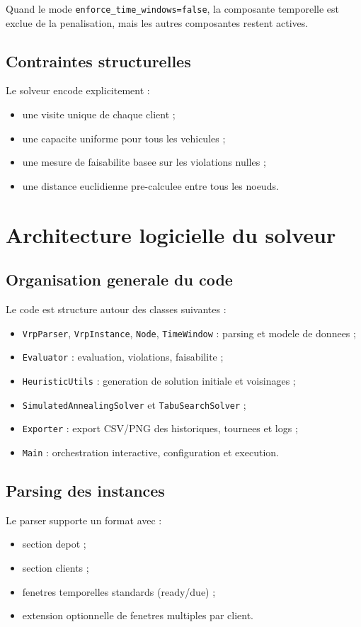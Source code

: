 \documentclass[12pt,a4paper]{report}
\begin{document}
Quand le mode \texttt{enforce\_time\_windows=false}, la composante temporelle est exclue de la penalisation,
mais les autres composantes restent actives.

\section{Contraintes structurelles}
Le solveur encode explicitement :
\begin{itemize}[leftmargin=1.2cm]
  \item une visite unique de chaque client ;
  \item une capacite uniforme pour tous les vehicules ;
  \item une mesure de faisabilite basee sur les violations nulles ;
  \item une distance euclidienne pre-calculee entre tous les noeuds.
\end{itemize}

\chapter{Architecture logicielle du solveur}

\section{Organisation generale du code}
Le code est structure autour des classes suivantes :
\begin{itemize}[leftmargin=1.2cm]
  \item \texttt{VrpParser}, \texttt{VrpInstance}, \texttt{Node}, \texttt{TimeWindow} : parsing et modele de donnees ;
  \item \texttt{Evaluator} : evaluation, violations, faisabilite ;
  \item \texttt{HeuristicUtils} : generation de solution initiale et voisinages ;
  \item \texttt{SimulatedAnnealingSolver} et \texttt{TabuSearchSolver} ;
  \item \texttt{Exporter} : export CSV/PNG des historiques, tournees et logs ;
  \item \texttt{Main} : orchestration interactive, configuration et execution.
\end{itemize}

\section{Parsing des instances}
Le parser supporte un format avec :
\begin{itemize}[leftmargin=1.2cm]
  \item section depot ;
  \item section clients ;
  \item fenetres temporelles standards (ready/due) ;
  \item extension optionnelle de fenetres multiples par client.
\end{itemize}
\end{document}

